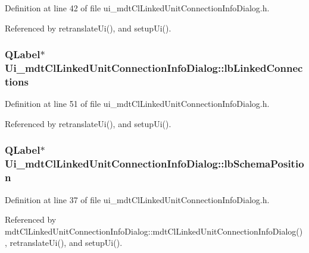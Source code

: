 Definition at line 42 of file ui\-\_\-mdt\-Cl\-Linked\-Unit\-Connection\-Info\-Dialog.\-h.



Referenced by retranslate\-Ui(), and setup\-Ui().

\hypertarget{class_ui__mdt_cl_linked_unit_connection_info_dialog_a16e4b5a99cbaee675ab2dee9141b6bd9}{
\subsubsection[{lb\-Linked\-Connections}]{\setlength{\rightskip}{0pt plus 5cm}Q\-Label$\ast$ Ui\-\_\-mdt\-Cl\-Linked\-Unit\-Connection\-Info\-Dialog\-::lb\-Linked\-Connections}}\label{class_ui__mdt_cl_linked_unit_connection_info_dialog_a16e4b5a99cbaee675ab2dee9141b6bd9}


Definition at line 51 of file ui\-\_\-mdt\-Cl\-Linked\-Unit\-Connection\-Info\-Dialog.\-h.



Referenced by retranslate\-Ui(), and setup\-Ui().

\hypertarget{class_ui__mdt_cl_linked_unit_connection_info_dialog_a8eacc9a070de8397d893beea7a2f41ee}{
\subsubsection[{lb\-Schema\-Position}]{\setlength{\rightskip}{0pt plus 5cm}Q\-Label$\ast$ Ui\-\_\-mdt\-Cl\-Linked\-Unit\-Connection\-Info\-Dialog\-::lb\-Schema\-Position}}\label{class_ui__mdt_cl_linked_unit_connection_info_dialog_a8eacc9a070de8397d893beea7a2f41ee}


Definition at line 37 of file ui\-\_\-mdt\-Cl\-Linked\-Unit\-Connection\-Info\-Dialog.\-h.



Referenced by mdt\-Cl\-Linked\-Unit\-Connection\-Info\-Dialog\-::mdt\-Cl\-Linked\-Unit\-Connection\-Info\-Dialog(), retranslate\-Ui(), and setup\-Ui().

